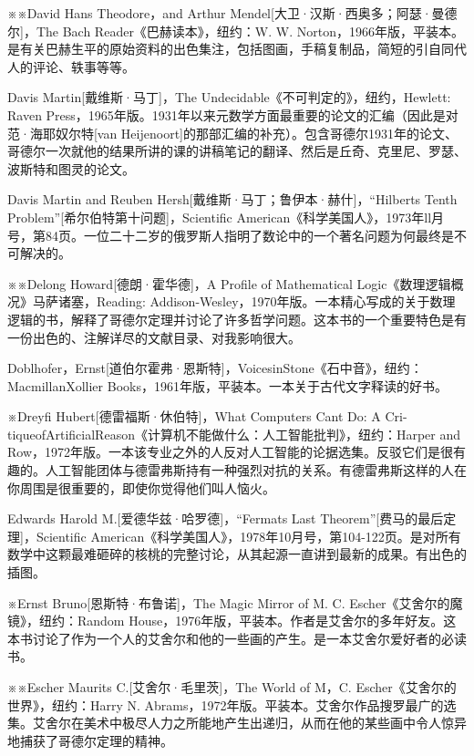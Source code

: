 \documentclass[
  12pt,
  twoside,
  openright,
  oldfontcommands,
]{memoir}
\begin{document}
※※David Hans Theodore，and Arthur Mendel{[}大卫·汉斯·西奥多；阿瑟·曼德尔{]}，The Bach Reader《巴赫读本》，纽约：W. W. Norton，1966年版，平装本。是有关巴赫生平的原始资料的出色集注，包括图画，手稿复制品，简短的引自同代人的评论、轶事等等。

Davis Martin{[}戴维斯·马丁{]}，The Undecidable《不可判定的》，纽约，Hewlett: Raven Press，1965年版。1931年以来元数学方面最重要的论文的汇编（因此是对范·海耶奴尔特{[}van Heijenoort{]}的那部汇编的补充）。包含哥德尔1931年的论文、哥德尔一次就他的结果所讲的课的讲稿笔记的翻译、然后是丘奇、克里尼、罗瑟、波斯特和图灵的论文。

Davis Martin and Reuben Hersh{[}戴维斯·马丁；鲁伊本·赫什{]}，``Hilbert\textquotesingle s Tenth Problem''{[}希尔伯特第十问题{]}，Scientific American《科学美国人》，1973年ll月号，第84页。一位二十二岁的俄罗斯人指明了数论中的一个著名问题为何最终是不可解决的。

※※Delong Howard{[}德朗·霍华德{]}，A Profile of Mathematical Logic《数理逻辑概况》马萨诸塞，Reading: Addison-Wesley，1970年版。一本精心写成的关于数理逻辑的书，解释了哥德尔定理并讨论了许多哲学问题。这本书的一个重要特色是有一份出色的、注解详尽的文献目录、对我影响很大。

Doblhofer，Ernst{[}道伯尔霍弗·恩斯特{]}，VoicesinStone《石中音》，纽约：MacmillanXollier Books，1961年版，平装本。一本关于古代文字释读的好书。

※Dreyfi Hubert{[}德雷福斯·休伯特{]}，What Computers Can\textquotesingle t Do: A Cri-tiqueofArtificialReason《计算机不能做什么：人工智能批判》，纽约：Harper and Row，1972年版。一本该专业之外的人反对人工智能的论据选集。反驳它们是很有趣的。人工智能团体与德雷弗斯持有一种强烈对抗的关系。有德雷弗斯这样的人在你周围是很重要的，即使你觉得他们叫人恼火。

Edwards Harold M.{[}爱德华兹·哈罗德{]}，``Fermat\textquotesingle s Last Theorem''{[}费马的最后定理{]}，Scientific American《科学美国人》，1978年10月号，第104-122页。是对所有数学中这颗最难砸碎的核桃的完整讨论，从其起源一直讲到最新的成果。有出色的插图。

※Ernst Bruno{[}恩斯特·布鲁诺{]}，The Magic Mirror of M. C. Escher《艾舍尔的魔镜》，纽约：Random House，1976年版，平装本。作者是艾舍尔的多年好友。这本书讨论了作为一个人的艾舍尔和他的一些画的产生。是一本艾舍尔爱好者的必读书。

※※Escher Maurits C.{[}艾舍尔·毛里茨{]}，The World of M，C. Escher《艾舍尔的世界》，纽约：Harry N. Abrams，1972年版。平装本。艾舍尔作品搜罗最广的选集。艾舍尔在美术中极尽人力之所能地产生出递归，从而在他的某些画中令人惊异地捕获了哥德尔定理的精神。
\end{document}
